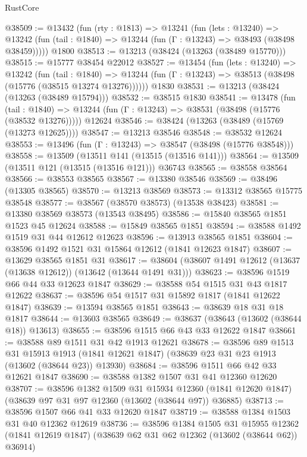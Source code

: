 \begin{lexlean}{RustCore}
\begin{coremodule}
@38509 := @13432
    (fun (rty : @1813) =>
    @13241
      (fun (lets : @13240) =>
      @13242 (fun (tail : @1840) => @13244 (fun (Γ : @13243) => @38493 (@38498 @38459)))))
    @1800
@38513 := @13213 (@38424 (@13263 (@38489 @15770)))
@38515 := @15777 @38454 @22012
@38527 := @13454
    (fun (lets : @13240) =>
    @13242
      (fun (tail : @1840) =>
      @13244 (fun (Γ : @13243) => @38513 (@38498 (@15776 (@38515 @13274 @13276))))))
    @1830
@38531 := @13213 (@38424 (@13263 (@38489 @15794)))
@38532 := @38515 @1830
@38541 := @13478
    (fun (tail : @1840) => @13244 (fun (Γ : @13243) => @38531 (@38498 (@15776 (@38532 @13276)))))
    @12624
@38546 := @38424 (@13263 (@38489 (@15769 (@13273 @12625))))
@38547 := @13213 @38546
@38548 := @38532 @12624
@38553 := @13496 (fun (Γ : @13243) => @38547 (@38498 (@15776 @38548)))
@38558 := @13509 (@13511 @141 (@13515 (@13516 @141)))
@38564 := @13509 (@13511 @121 (@13515 (@13516 @121))) @36743
@38565 := @38558 @38564
@38566 := @38553 @38565
@38567 := @13380 @38546
@38569 := @38496 (@13305 @38565)
@38570 := @13213 @38569
@38573 := @13312 @38565 @15775 @38548
@38577 := @38567 (@38570 @38573) (@13538 @38423)
@38581 := @13380 @38569 @38573 (@13543 @38495)
@38586 := @15840 @38565 @1851 @1523 @45 @12624
@38588 := @15849 @38565 @1851
@38594 := @38588 @1492 @1519 @31 @44 @12612 @12623
@38596 := @13913 @38565 @1851
@38604 := @38596 @1492 @1521 @31 @15864 @12612 (@1841 @12623 @1847)
@38607 := @13629 @38565 @1851 @31
@38617 := @38604 (@38607 @1491 @12612 (@13637 (@13638 @12612)) (@13642 (@13644 @1491 @31)))
@38623 := @38596 @1519 @66 @44 @33 @12623 @1847
@38629 := @38588 @54 @1515 @31 @43 @1817 @12622
@38637 := @38596 @54 @1517 @31 @15892 @1817 (@1841 @12622 @1847)
@38639 := @13594 @38565 @1851
@38643 := @38639 @18 @31 @18 @1817
@38644 := @13603 @38565
@38649 := @38637 (@38643 (@13602 (@38644 @18)) @13613)
@38655 := @38596 @1515 @66 @43 @33 @12622 @1847
@38661 := @38588 @89 @1511 @31 @42 @1913 @12621
@38678 := @38596
    @89
    @1513
    @31
    @15913
    @1913
    (@1841 @12621 @1847)
    (@38639 @23 @31 @23 @1913 (@13602 (@38644 @23)) @13930)
@38684 := @38596 @1511 @66 @42 @33 @12621 @1847
@38690 := @38588 @1382 @1507 @31 @41 @12360 @12620
@38707 := @38596
    @1382
    @1509
    @31
    @15934
    @12360
    (@1841 @12620 @1847)
    (@38639 @97 @31 @97 @12360 (@13602 (@38644 @97)) @36885)
@38713 := @38596 @1507 @66 @41 @33 @12620 @1847
@38719 := @38588 @1384 @1503 @31 @40 @12362 @12619
@38736 := @38596
    @1384
    @1505
    @31
    @15955
    @12362
    (@1841 @12619 @1847)
    (@38639 @62 @31 @62 @12362 (@13602 (@38644 @62)) @36914)

\end{coremodule}
\end{lexlean}
